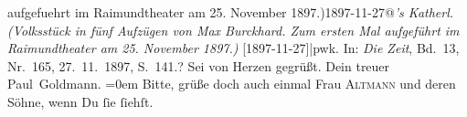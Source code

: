 \begin{ledgroupsized}[t]{13cm}
{{{{                  aufgefuehrt im Raimundtheater am 25. November 1897.)1897-11-27@\strich\emph{’s Katherl. (Volksstück in fünf Aufzügen von Max Burckhard. Zum ersten Mal aufgeführt im Raimundtheater am 25. November 1897.)} {[}1897-11-27{]}|pwk}. In:
                        \emph{Die Zeit}, Bd. 13, Nr. 165, 27. 11. 1897, S. 141.}}}\label{K_L02833-77h}?\pend
           \pstart
           Sei von Herzen gegrüßt.\pend
           \pstart
           Dein treuer {\\[\baselineskip]}\spacefill\mbox{Paul Goldmann.}\pend
           \leftskip=0em{}\pstart
           \noindent{}Bitte, grüße doch auch einmal Frau \textsc{Altmann} und deren {\pb}Söhne, wenn Du
                  ſie ſiehſt.\pend
           
         
         \endnumbering{}\end{ledgroupsized}  \newcommand{\dateiname}{L02833}\newcommand{\titel}{Paul Goldmann an Arthur Schnitzler, 10. 12. [1897]}\newcommand{\editorInnen}{Martin Anton Müller und Laura Untner}
      